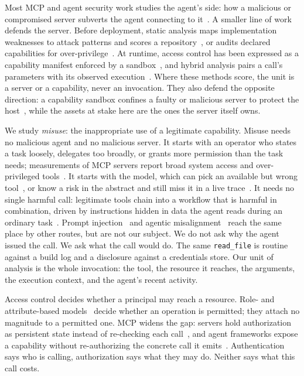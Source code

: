 Most MCP and agent security work studies the agent's side: how a malicious or
compromised server subverts the agent connecting to
it~\cite{invariant2025toolpoisoning,shi2025toolhijacker}. A smaller line of work
defends the server. Before deployment, static analysis maps implementation
weaknesses to attack patterns and scores a repository~\cite{kumar2026mcpinsos},
or audits declared capabilities for over-privilege~\cite{huang2026auditing}. At
runtime, access control has been expressed as a capability manifest enforced by
a sandbox~\cite{buhler2026agentbound}, and hybrid analysis pairs a call's
parameters with its observed execution~\cite{he2026mtguard}. Where these methods
score, the unit is a server or a capability, never an invocation. They also
defend the opposite direction: a capability sandbox confines a faulty or
malicious server to protect the host~\cite{buhler2026agentbound}, while the
assets at stake here are the ones the server itself owns.

We study \emph{misuse}: the inappropriate use of a legitimate capability. Misuse
needs no malicious agent and no malicious server. It starts with an operator who
states a task loosely, delegates too broadly, or grants more permission than the
task needs; measurements of MCP servers report broad system access and
over-privileged tools~\cite{li2025privilege,huang2026auditing}. It starts with
the model, which can pick an available but wrong tool~\cite{yin2025reasoningtrap},
or know a risk in the abstract and still miss it in a live
trace~\cite{tang2025riskknowledge}. It needs no single harmful call: legitimate
tools chain into a workflow that is harmful in combination, driven by
instructions hidden in data the agent reads during an ordinary
task~\cite{zhao2026parasites}. Prompt injection~\cite{zhan2024injecagent} and
agentic misalignment~\cite{lynch2025misalignment} reach the same place by other
routes, but are not our subject. We do not ask why the agent issued the call. We
ask what the call would do. The same \texttt{read\_file} is routine against a
build log and a disclosure against a credentials store. Our unit of analysis is
the whole invocation: the tool, the resource it reaches, the arguments, the
execution context, and the agent's recent activity.

Access control decides whether a principal may reach a resource. Role- and
attribute-based models~\cite{sandhu1996rbac,hu2014abac} decide whether an
operation is permitted; they attach no magnitude to a permitted one. MCP widens
the gap: servers hold authorization as persistent state instead of re-checking
each call~\cite{huang2026caller}, and agent frameworks expose a capability
without re-authorizing the concrete call it emits~\cite{mellafe2026capability}.
Authentication says who is calling, authorization says what they may do. Neither
says what this call costs.


